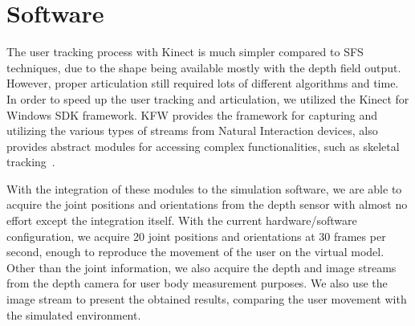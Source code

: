 \section{Software}

The user tracking process with Kinect is much simpler compared to SFS techniques, due to the shape being available mostly with the depth field output. However, proper articulation still required lots of different algorithms and time. In order to speed up the user tracking and articulation, we utilized the Kinect for Windows SDK framework. KFW provides the framework for capturing and utilizing the various types of streams from Natural Interaction devices, also provides abstract modules for accessing complex functionalities, such as skeletal tracking~\cite{OpenNI2102}. 

With the integration of these modules to the simulation software, we are able to acquire the joint positions and orientations from the depth sensor with almost no effort except the integration itself. With the current hardware/software configuration, we acquire 20 joint positions and orientations at 30 frames per second, enough to reproduce the movement of the user on the virtual model. Other than the joint information, we also acquire the depth and image streams from the depth camera for user body measurement purposes. We also use the image stream to present the obtained results, comparing the user movement with the simulated environment.